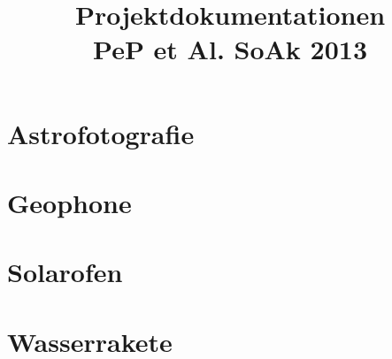 \documentclass[pdftex, twoside, BCOR12mm, parskip=half]{scrartcl}
\begin{document}
\title{Projektdokumentationen \\
		\large{PeP et Al. SoAk 2013}}


\maketitle
\thispagestyle{empty}
\setcounter{page}{0}
\newpage
\newpage
\tableofcontents
\newpage

\section{Astrofotografie}

\section{Geophone}
\section{Solarofen}
\section{Wasserrakete}
\end{document}
